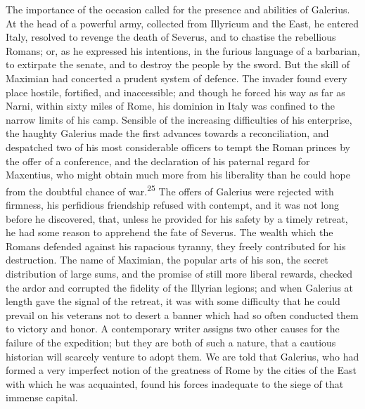 The importance of the occasion called for the presence and
abilities of Galerius. At the head of a powerful army, collected
from Illyricum and the East, he entered Italy, resolved to
revenge the death of Severus, and to chastise the rebellious
Romans; or, as he expressed his intentions, in the furious
language of a barbarian, to extirpate the senate, and to destroy
the people by the sword. But the skill of Maximian had concerted
a prudent system of defence. The invader found every place
hostile, fortified, and inaccessible; and though he forced his
way as far as Narni, within sixty miles of Rome, his dominion in
Italy was confined to the narrow limits of his camp. Sensible of
the increasing difficulties of his enterprise, the haughty
Galerius made the first advances towards a reconciliation, and
despatched two of his most considerable officers to tempt the
Roman princes by the offer of a conference, and the declaration
of his paternal regard for Maxentius, who might obtain much more
from his liberality than he could hope from the doubtful chance
of war.\textsuperscript{25} The offers of Galerius were rejected with firmness,
his perfidious friendship refused with contempt, and it was not
long before he discovered, that, unless he provided for his
safety by a timely retreat, he had some reason to apprehend the
fate of Severus. The wealth which the Romans defended against his
rapacious tyranny, they freely contributed for his destruction.
The name of Maximian, the popular arts of his son, the secret
distribution of large sums, and the promise of still more liberal
rewards, checked the ardor and corrupted the fidelity of the
Illyrian legions; and when Galerius at length gave the signal of
the retreat, it was with some difficulty that he could prevail on
his veterans not to desert a banner which had so often conducted
them to victory and honor. A contemporary writer assigns two
other causes for the failure of the expedition; but they are both
of such a nature, that a cautious historian will scarcely venture
to adopt them. We are told that Galerius, who had formed a very
imperfect notion of the greatness of Rome by the cities of the
East with which he was acquainted, found his forces inadequate to
the siege of that immense capital.

